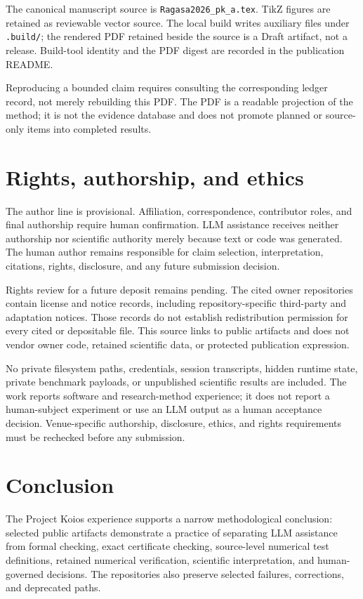 \documentclass[11pt]{article}
\newcommand{\projectkoios}{Project Koios}
\begin{document}
The canonical manuscript source is \texttt{Ragasa2026\_pk\_a.tex}. TikZ figures
are retained as reviewable vector source. The local build writes auxiliary files
under \texttt{.build/}; the rendered PDF retained beside the source is a Draft
artifact, not a release. Build-tool identity and the PDF digest are recorded in
the publication README.

Reproducing a bounded claim requires consulting the corresponding ledger record,
not merely rebuilding this PDF. The PDF is a readable projection of the method;
it is not the evidence database and does not promote planned or source-only
items into completed results.

\section{Rights, authorship, and ethics}
\label{sec:rights}

The author line is provisional. Affiliation, correspondence, contributor roles,
and final authorship require human confirmation. LLM assistance receives neither
authorship nor scientific authority merely because text or code was generated.
The human author remains responsible for claim selection, interpretation,
citations, rights, disclosure, and any future submission decision.

Rights review for a future deposit remains pending. The cited owner repositories
contain license and notice records, including repository-specific third-party
and adaptation notices. Those records do not establish redistribution
permission for every cited or depositable file. This source links to public
artifacts and does not vendor owner code, retained scientific data, or protected
publication expression.

No private filesystem paths, credentials, session transcripts, hidden runtime
state, private benchmark payloads, or unpublished scientific results are
included. The work reports software and research-method experience; it does not
report a human-subject experiment or use an LLM output as a human acceptance
decision. Venue-specific authorship, disclosure, ethics, and rights requirements
must be rechecked before any submission.

\section{Conclusion}

The \projectkoios{} experience supports a narrow methodological conclusion:
selected public artifacts demonstrate a practice of separating LLM assistance
from formal checking, exact certificate checking, source-level numerical test
definitions, retained numerical verification, scientific interpretation, and
human-governed decisions. The repositories also preserve selected failures,
corrections, and deprecated paths.
\end{document}
